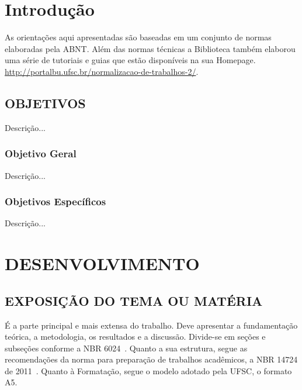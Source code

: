 \documentclass{ufscThesis} %
\begin{document}
\folhaderosto[comficha] %
\folhaaprovacao
\paginadedicatoria
\paginaagradecimento
\paginaepigrafe
\paginaresumo
\paginaabstract
\listadefiguras %
\listadetabelas 
\listadeabreviaturas
\listadesimbolos
\sumario

\chapter{Introdução}
As orientações aqui apresentadas são baseadas em um conjunto de normas elaboradas pela ABNT. Além das normas técnicas a Biblioteca também elaborou  uma série de tutoriais e guias que estão disponíveis na sua Homepage. \url{http://portalbu.ufsc.br/normalizacao-de-trabalhos-2/}. 


\section{OBJETIVOS}

Descrição...

\subsection{Objetivo Geral}

Descrição...

\subsection{Objetivos Específicos}

Descrição...

\chapter{DESENVOLVIMENTO}

\section{EXPOSIÇÃO DO TEMA OU MATÉRIA}

É a parte principal e mais extensa do trabalho. Deve apresentar a fundamentação teórica, a metodologia, os resultados e a discussão. Divide-se em seções e subseções conforme a NBR 6024~\cite{abnt14724}. Quanto a sua estrutura, segue as recomendações da norma para preparação de trabalhos acadêmicos, a NBR 14724 de 2011~\cite{abnt14724}. Quanto à Formatação, segue o modelo adotado pela UFSC, o formato A5.
\end{document}
